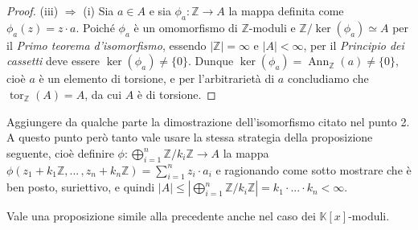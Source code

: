 \documentclass{article}
\theoremstyle{definition}
\newcommand{\tor}{\operatorname{tor}}
\newcommand{\Ann}{\operatorname{Ann}}
\begin{document}
\begin{proof}
\vspace{0.5mm}

\noindent (iii) $\Rightarrow$ (i) Sia $a\in A$ e sia $\phi_a\colon \mathbb{Z}\to A$ la mappa definita come $\phi_a(z)=z\cdot a$. Poiché $\phi_a$ è un omomorfismo di $\mathbb{Z}$-moduli e $\mathbb{Z}/\ker(\phi_a)\simeq A$ per il \emph{Primo teorema d'isomorfismo}, essendo $|\mathbb{Z}|=\infty$ e $|A|<\infty$, per il \emph{Principio dei cassetti} deve essere $\ker(\phi_a)\neq \{0\}$. Dunque $\ker(\phi_a)=\Ann_{\mathbb{Z}}(a)\neq \{0\}$, cioè $a$ è un elemento di torsione, e per l'arbitrarietà di $a$ concludiamo che $\tor_{\mathbb{Z}}(A)=A$, da cui $A$ è di torsione.
\end{proof}

\noindent Aggiungere da qualche parte la dimostrazione dell'isomorfismo citato nel punto 2. A questo punto però tanto vale usare la stessa strategia della proposizione seguente, cioè definire $\phi\colon \bigoplus\limits_{i=1}^n \mathbb{Z}/k_i\mathbb{Z}\to A$ la mappa $\phi(z_1+k_1\mathbb{Z}, ...\,, z_n+k_n\mathbb{Z})=\sum\limits_{i=1}^n z_i\cdot a_i$ e ragionando come sotto mostrare che è ben posto, suriettivo, e quindi $|A|\leq \left|\bigoplus\limits_{i=1}^n \mathbb{Z}/k_i\mathbb{Z}\right|=k_1\cdot ...\cdot k_n<\infty$. 

\clearpage

\noindent Vale una proposizione simile alla precedente anche nel caso dei $\mathbb{K}[x]$-moduli.
\end{document}
